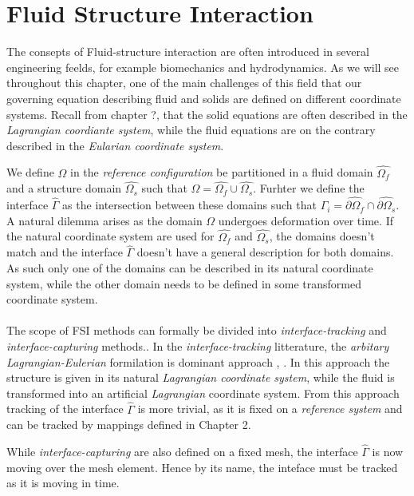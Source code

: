 \chapter{Fluid Structure Interaction}


The consepts of Fluid-structure interaction are often introduced in several engineering feelds, for example biomechanics and hydrodynamics. As we will see throughout this chapter, one of the main challenges of this field that our governing equation describing fluid and solids are defined on different coordinate systems. Recall from chapter ?, that the solid equations are often described in the \textit{Lagrangian coordiante system}, while the fluid equations are on the contrary described in the \textit{Eularian coordinate system}. 

We define $\Omega$ in the \textit{reference configuration} be partitioned in a fluid domain $\hat{\Omega_f}$ and a structure domain $\hat{\Omega_s}$ such that
$\Omega = \hat{\Omega_f} \cup \hat{\Omega_s}$. Furhter we define the interface $\hat{\Gamma}$ as the intersection between these domains such that $\Gamma_i = \hat{\partial \Omega_f} \cap \hat{\partial \Omega_s}$.  A natural dilemma arises as the domain $\Omega$ undergoes deformation over time. If the natural coordinate system are used for $\hat{\Omega_f}$ and $\hat{\Omega_s}$, the domains doesn't match and the interface $\hat{\Gamma}$ doesn't have a general description for both domains. As such only one of the domains can be described in its natural coordinate system, while the other domain needs to be defined in some transformed coordinate system. \\ \\

The scope of FSI methods can formally be divided into \textit{interface-tracking} and \textit{interface-capturing } methods.\cite{Frei2016}. In the \textit{interface-tracking} litterature, the \textit{arbitary Lagrangian-Eulerian} formilation is dominant approach \cite{Richter2010a}, \cite{Frei2016}. In this approach the structure is given in its natural \textit{Lagrangian coordinate system}, while the fluid is transformed into an artificial \textit{Lagrangian} coordinate system. From this approach tracking of the interface $\hat{\Gamma}$ is more trivial, as it is fixed on a \textit{reference system} and can be tracked by mappings defined in Chapter 2. 

While \textit{interface-capturing } are also defined on a fixed mesh, the interface  $\hat{\Gamma}$ is now moving over the mesh element. Hence by its name, the inteface must be tracked as it is moving in time. 

